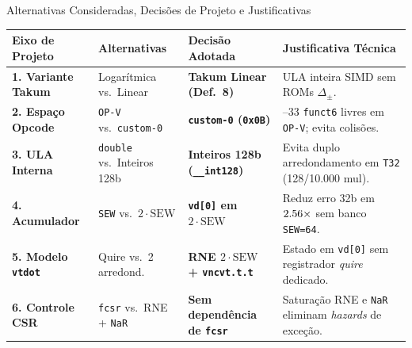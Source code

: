 \documentclass[aspectratio=169,10pt]{beamer}
\begin{document}
\begin{frame}{Alternativas Consideradas, Decisões de Projeto e Justificativas}
	\footnotesize
	\begin{table}
		\centering
		\setlength{\tabcolsep}{3pt}
		\renewcommand{\arraystretch}{1.12}
		\begin{tabular}{@{}>{\raggedright\arraybackslash}p{}>{\raggedright\arraybackslash}p{}>{\raggedright\arraybackslash}p{}>{\raggedright\arraybackslash}p{}@{}}
			\toprule
			\textbf{Eixo de Projeto} & \textbf{Alternativas} & \textbf{Decisão Adotada} & \textbf{Justificativa Técnica} \\
			\midrule
			\textbf{1. Variante Takum} & Logarítmica vs.\ Linear & \textbf{Takum Linear (Def.~8)} & ULA inteira SIMD sem ROMs $\Delta_\pm$. \\
			\textbf{2. Espaço Opcode} & \texttt{OP-V} vs.\ \texttt{custom-0} & \textbf{\texttt{custom-0} (\texttt{0x0B})} & 11--33 \texttt{funct6} livres em \texttt{OP-V}; evita colisões. \\
			\textbf{3. ULA Interna} & \texttt{double} vs.\ Inteiros 128b & \textbf{Inteiros 128b (\texttt{\_\_int128})} & Evita duplo arredondamento em \texttt{T32} (128/10.000 mul). \\
			\textbf{4. Acumulador} & \texttt{SEW} vs.\ $2\cdot\mathrm{SEW}$ & \textbf{\texttt{vd[0]} em $2\cdot\mathrm{SEW}$} & Reduz erro 32b em $2.56\times$ sem banco \texttt{SEW=64}. \\
			\textbf{5. Modelo \texttt{vtdot}} & Quire vs.\ 2 arredond. & \textbf{RNE $2\cdot\mathrm{SEW}$ + \texttt{vncvt.t.t}} & Estado em \texttt{vd[0]} sem registrador \emph{quire} dedicado. \\
			\textbf{6. Controle CSR} & \texttt{fcsr} vs.\ RNE + \texttt{NaR} & \textbf{Sem dependência de \texttt{fcsr}} & Saturação RNE e \texttt{NaR} eliminam \emph{hazards} de exceção. \\
			\bottomrule
		\end{tabular}
	\end{table}
\end{frame}
\end{document}
